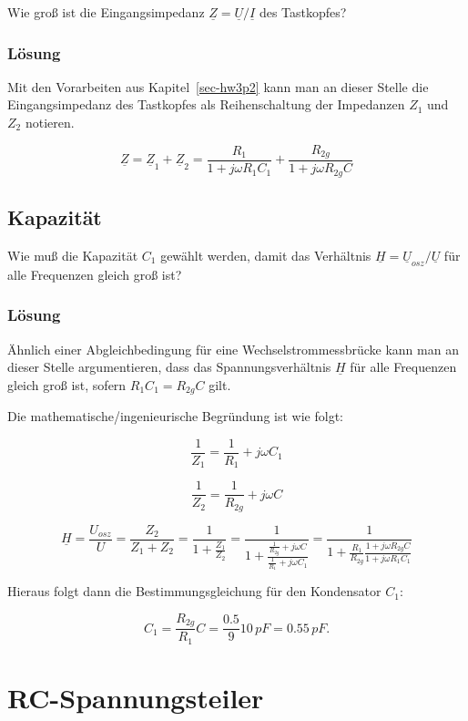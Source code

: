 \documentclass[
  ngerman,
  letterpaper,
]{scrbook}
\begin{document}
Wie groß ist die Eingangsimpedanz
\(\underline{Z}=\underline{U}/\underline{I}\) des Tastkopfes?

\subsubsection{Lösung}\label{luxf6sung-16}

Mit den Vorarbeiten aus Kapitel~\ref{sec-hw3p2} kann man an dieser
Stelle die Eingangsimpedanz des Tastkopfes als Reihenschaltung der
Impedanzen \(Z_1\) und \(Z_2\) notieren.

\[
\underline{Z} = \underline{Z}_1 + \underline{Z}_2 = \frac{R_1}{1 + j \omega R_1 C_1} + \frac{R_{2g}}{1+ j \omega R_{2g} C}
\]

\subsection{Kapazität}\label{kapazituxe4t}

Wie muß die Kapazität \(C_1\) gewählt werden, damit das Verhältnis
\(\underline{H}=\underline{U}_{osz}/\underline{U}\) für alle Frequenzen
gleich groß ist?

\subsubsection{Lösung}\label{luxf6sung-17}

Ähnlich einer Abgleichbedingung für eine Wechselstrommessbrücke kann man
an dieser Stelle argumentieren, dass das Spannungsverhältnis
\(\underline{H}\) für alle Frequenzen gleich groß ist, sofern
\(R_1C_1 = R_{2g}C\) gilt.

Die mathematische/ingenieurische Begründung ist wie folgt:

\[
\frac{1}{Z_1} = \frac{1}{R_1} + j \omega C_1 
\]

\[ 
\frac{1}{Z_2} = \frac{1}{R_{2g}} + j \omega C 
\]

\[ 
\underline{H} = \frac{U_{osz}}{U} = \frac{Z_2}{Z_1 + Z_2} = \frac{1}{1+\frac{Z_1}{Z_2}}
= \frac{1}{1+\frac{\frac{1}{R_{2g}}+j \omega C}{\frac{1}{R_1}+j \omega C_1}}
= \frac{1}{1+\frac{R_1}{R_{2g}}\frac{1+j \omega R_{2g} C}{1+ j \omega R_1 C_1}}
\]

Hieraus folgt dann die Bestimmungsgleichung für den Kondensator \(C_1\):

\[
C_1 = \frac{R_{2g}}{R_1} C = \frac{0.5}{9} 10\,pF = 0.55\,pF.
\]

\section{RC-Spannungsteiler}\label{rc-spannungsteiler}
\end{document}
